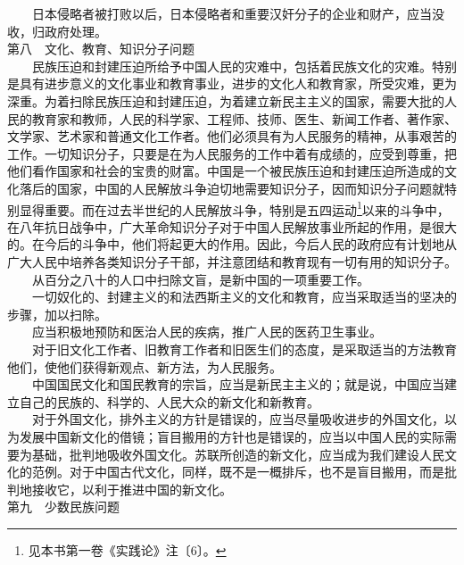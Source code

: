 \documentclass[cn,11pt,chinese]{elegantbook}
\begin{document}
　　日本侵略者被打败以后，日本侵略者和重要汉奸分子的企业和财产，应当没收，归政府处理。\\
第八　文化、教育、知识分子问题\\
　　民族压迫和封建压迫所给予中国人民的灾难中，包括着民族文化的灾难。特别是具有进步意义的文化事业和教育事业，进步的文化人和教育家，所受灾难，更为深重。为着扫除民族压迫和封建压迫，为着建立新民主主义的国家，需要大批的人民的教育家和教师，人民的科学家、工程师、技师、医生、新闻工作者、著作家、文学家、艺术家和普通文化工作者。他们必须具有为人民服务的精神，从事艰苦的工作。一切知识分子，只要是在为人民服务的工作中着有成绩的，应受到尊重，把他们看作国家和社会的宝贵的财富。中国是一个被民族压迫和封建压迫所造成的文化落后的国家，中国的人民解放斗争迫切地需要知识分子，因而知识分子问题就特别显得重要。而在过去半世纪的人民解放斗争，特别是五四运动\footnote[22]{  见本书第一卷《实践论》注〔6〕。}以来的斗争中，在八年抗日战争中，广大革命知识分子对于中国人民解放事业所起的作用，是很大的。在今后的斗争中，他们将起更大的作用。因此，今后人民的政府应有计划地从广大人民中培养各类知识分子干部，并注意团结和教育现有一切有用的知识分子。\\
　　从百分之八十的人口中扫除文盲，是新中国的一项重要工作。\\
　　一切奴化的、封建主义的和法西斯主义的文化和教育，应当采取适当的坚决的步骤，加以扫除。\\
　　应当积极地预防和医治人民的疾病，推广人民的医药卫生事业。\\
　　对于旧文化工作者、旧教育工作者和旧医生们的态度，是采取适当的方法教育他们，使他们获得新观点、新方法，为人民服务。\\
　　中国国民文化和国民教育的宗旨，应当是新民主主义的；就是说，中国应当建立自己的民族的、科学的、人民大众的新文化和新教育。\\
　　对于外国文化，排外主义的方针是错误的，应当尽量吸收进步的外国文化，以为发展中国新文化的借镜；盲目搬用的方针也是错误的，应当以中国人民的实际需要为基础，批判地吸收外国文化。苏联所创造的新文化，应当成为我们建设人民文化的范例。对于中国古代文化，同样，既不是一概排斥，也不是盲目搬用，而是批判地接收它，以利于推进中国的新文化。\\
第九　少数民族问题\\
\end{document}
